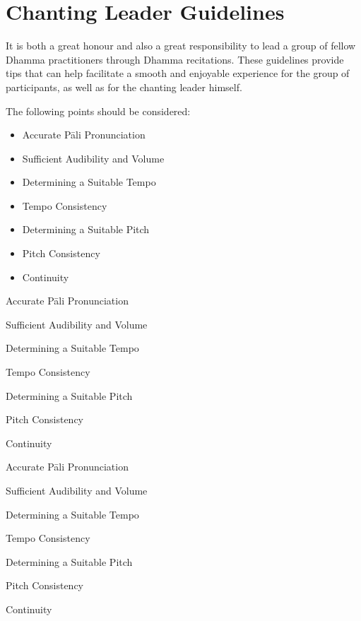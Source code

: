 
\section{Chanting Leader Guidelines}

  It is both a great honour and also a great responsibility to lead a group of fellow Dhamma practitioners through Dhamma recitations. These guidelines provide tips that can help facilitate a smooth and enjoyable experience for the group of participants, as well as for the chanting leader himself.

The following points should be considered:

\ifafive
\begin{itemize}
  \item Accurate Pāli Pronunciation
  \item Sufficient Audibility and Volume
  \item Determining a Suitable Tempo
  \item Tempo Consistency
  \item Determining a Suitable Pitch
  \item Pitch Consistency
  \item Continuity
\end{itemize}
\fi

\ifninebythirteen
\begin{packeditemize}
  \item Accurate Pāli Pronunciation
  \item Sufficient Audibility and Volume
  \item Determining a Suitable Tempo
  \item Tempo Consistency
  \item Determining a Suitable Pitch
  \item Pitch Consistency
  \item Continuity
\end{packeditemize}
\fi

\ifbfive
\begin{packeditemize}
  \item Accurate Pāli Pronunciation
  \item Sufficient Audibility and Volume
  \item Determining a Suitable Tempo
  \item Tempo Consistency
  \item Determining a Suitable Pitch
  \item Pitch Consistency
  \item Continuity
\end{packeditemize}
\fi

